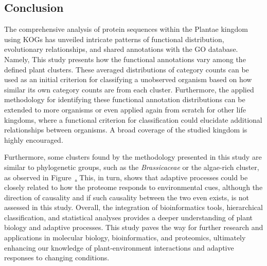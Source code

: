 \subsection{Conclusion}
\label{sec:conclusion.conclusion}

The comprehensive analysis of protein 
sequences within the Plantae kingdom using KOGs has 
unveiled intricate patterns of functional distribution, 
evolutionary relationships, and shared annotations with 
the GO database. Namely, This study presents 
how the functional annotations vary among the defined plant 
clusters. These averaged distributions of category counts 
can be used as an initial criterion for classifying a 
unobserved organism based on how similar its own category counts 
are from each cluster. Furthermore, the applied methodology 
for identifying these functional annotation distributions 
can be extended to more organisms or even applied again 
from scratch for other life kingdoms, where a 
functional criterion for classification could elucidate 
additional relationships between organisms. A broad coverage of 
the studied kingdom is highly encouraged.

Furthermore, some clusters found by the methodology presented 
in this study are similar to phylogenetic groups, such 
as the \emph{Brassicaceae} or the algae-rich cluster, as observed
in Figure~\href{fig:clustermap}. This, in 
turn, shows that adaptive processes could be closely related 
to how the proteome responds to environmental cues, although 
the direction of causality and if such causality between the 
two even exists, is not assessed in this study.
Overall, the integration of bioinformatics tools, 
hierarchical classification, and statistical analyses provides 
a deeper understanding of plant biology and adaptive processes. 
This study paves the way for further research and 
applications in molecular biology, bioinformatics, and 
proteomics, ultimately enhancing our knowledge of 
plant-environment interactions and adaptive responses to 
changing conditions.
